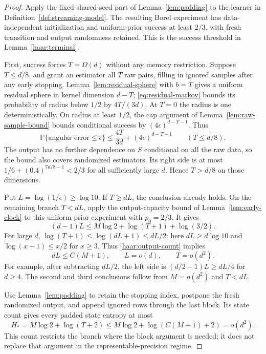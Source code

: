 \begin{proof}
Apply the fixed-shared-seed part of Lemma~\ref{lem:padding} to the learner
in Definition~\ref{def:streaming-model}.  The resulting Borel experiment
has data-independent initialization and uniform-prior success at least
$2/3$, with fresh transition and output randomness retained.  This is
the success threshold in Lemma~\ref{haar:terminal}.

First, success forces $T=\Omega(d)$ without any memory restriction.
Suppose $T\le d/8$, and grant an estimator all $T$ raw pairs, filling
in ignored samples after any early stopping.  Lemma~\ref{lem:residual-sphere}
with $b=T$ gives a uniform residual sphere in kernel dimension $d-T$;
\eqref{eq:residual-markov} bounds its probability of radius below $1/2$
by $4T/(3d)$.  At $T=0$ the radius is one deterministically.  On radius
at least $1/2$, the cap argument of Lemma~\ref{lem:raw-sample-bound}
bounds conditional success by $(4\epsilon)^{d-T-1}$.  Thus
\begin{equation}\label{haar:raw-sample-bound}
 \mathbb P\{\text{angular error}\le\epsilon\}
 \le\frac{4T}{3d}+(4\epsilon)^{d-T-1}
       \qquad(T\le d/8).
\end{equation}
The output has no further dependence on $S$ conditional on all the raw
data, so the bound also covers randomized estimators.  Its right side is
at most $1/6+(0.4)^{7d/8-1}<2/3$ for all sufficiently large $d$.
Hence $T>d/8$ on those dimensions.

Put $L=\log(1/\epsilon)\ge\log10$.  If $T\ge dL$, the conclusion already
holds.  On the remaining branch $T<dL$, apply the output-capacity bound
of Lemma~\ref{lem:early-clock} to this uniform-prior experiment with
$p_0=2/3$.  It gives
\begin{equation}\label{haar:output-count}
 (d-1)L\le M\log2+\log(T+1)+\log(3/2).
\end{equation}
For large $d$, $\log(T+1)\le\log(dL+1)\le dL/2$: here $dL\ge d\log10$
and $\log(x+1)\le x/2$ for $x\ge3$.  Thus
\eqref{haar:output-count} implies
\begin{equation}\label{haar:short-clock}
 dL\le C(M+1),\qquad L=o(d),\qquad T=o(d^2).
\end{equation}
For example, after subtracting $dL/2$, the left side is
$(d/2-1)L\ge dL/4$ for $d\ge4$.  The second and third conclusions follow
from $M=o(d^2)$ and $T<dL$.

Use Lemma~\ref{lem:padding} to retain the stopping index, postpone the
fresh randomized output, and append ignored rows through the last block.
Its state count gives every padded state entropy at most
\begin{equation}\label{haar:padded-width}
 H_*=M\log2+\log(T+2)
 \le M\log2+\log(C(M+1)+2)=o(d^2).
\end{equation}
This count restricts the branch where the block argument is needed; it
does not replace that argument in the representable-precision regime.


\end{proof}
